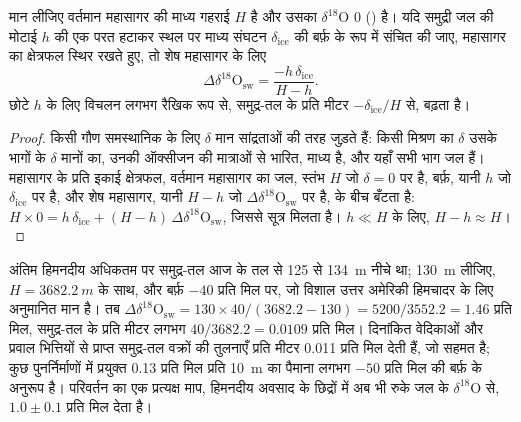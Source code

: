 \begin{proposition}[द्रव्यमान संतुलन से हिम-आयतन प्रभाव]\label{prop:b2:climate-proxies:mass-balance}
मान लीजिए वर्तमान महासागर की माध्य गहराई $H$ है और उसका $\delta^{18}$O 0 () है। यदि समुद्री
जल की मोटाई $h$ की एक परत हटाकर स्थल पर माध्य संघटन
$\delta_{\mathrm{ice}}$ की बर्फ़ के रूप में संचित की जाए, महासागर का क्षेत्रफल स्थिर रखते हुए, तो शेष महासागर के लिए
\[
  \Delta\delta^{18}\mathrm{O}_{\mathrm{sw}} = \frac{-h\,\delta_{\mathrm{ice}}}{H - h}.
\]
छोटे $h$ के लिए विचलन लगभग रैखिक रूप से, समुद्र-तल के प्रति मीटर $-\delta_{\mathrm{ice}}/H$ से, बढ़ता है।
\end{proposition}

\begin{proof}
किसी गौण समस्थानिक के लिए $\delta$ मान सांद्रताओं की तरह जुड़ते हैं: किसी मिश्रण का $\delta$
उसके भागों के $\delta$ मानों का, उनकी ऑक्सीजन की मात्राओं से भारित, माध्य है, और यहाँ सभी
भाग जल हैं। महासागर के प्रति इकाई क्षेत्रफल, वर्तमान महासागर का जल, स्तंभ $H$ जो $\delta = 0$ पर है,
बर्फ़, यानी $h$ जो $\delta_{\mathrm{ice}}$ पर है, और शेष महासागर, यानी $H - h$ जो
$\Delta\delta^{18}\mathrm{O}_{\mathrm{sw}}$ पर है, के बीच बँटता है:
$H \times 0 = h\,\delta_{\mathrm{ice}} + (H - h)\,\Delta\delta^{18}\mathrm{O}_{\mathrm{sw}}$, जिससे
सूत्र मिलता है। $h \ll H$ के लिए, $H - h \approx H$।
\end{proof}

\begin{example}[अंतिम हिमनदीय महासागर]\label{ex:b2:climate-proxies:lgm}
अंतिम हिमनदीय अधिकतम पर समुद्र-तल आज के तल से 125 से \qty{134}{m} नीचे था; \qty{130}{m} लीजिए,
$H = \qty{3682.2}{m}$ के साथ, और बर्फ़ $-40$ प्रति मिल पर, जो विशाल उत्तर
अमेरिकी हिमचादर के लिए अनुमानित मान है। तब
$\Delta\delta^{18}\mathrm{O}_{\mathrm{sw}} = 130 \times 40/(3682.2 - 130) = 5200/3552.2 = 1.46$
प्रति मिल, समुद्र-तल के प्रति मीटर लगभग $40/3682.2 = 0.0109$ प्रति मिल। दिनांकित वेदिकाओं और प्रवाल भित्तियों से प्राप्त
समुद्र-तल वक्रों की तुलनाएँ प्रति मीटर \num{0.011} प्रति मिल देती हैं, जो सहमत है; कुछ पुनर्निर्माणों में प्रयुक्त
\num{0.13} प्रति मिल प्रति \qty{10}{m} का पैमाना लगभग $-50$ प्रति मिल की बर्फ़ के
अनुरूप है। परिवर्तन का एक प्रत्यक्ष माप, हिमनदीय अवसाद के छिद्रों में अब भी रुके जल के $\delta^{18}$O से,
$1.0 \pm 0.1$ प्रति मिल देता है।
\end{example}

